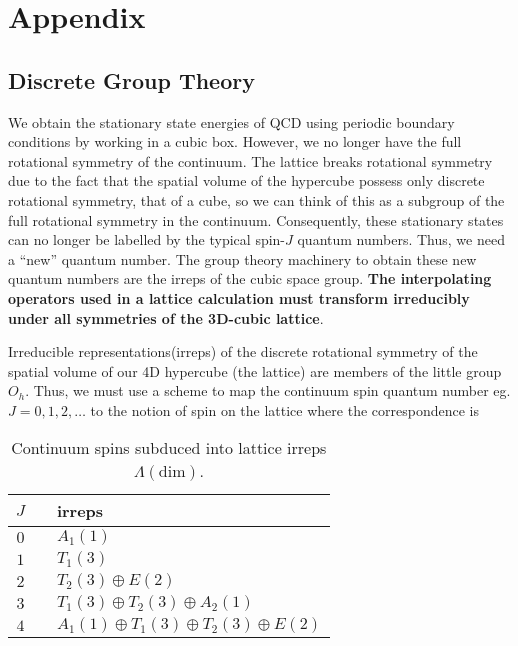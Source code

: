 \chapter{Appendix}
\label{sec:app}

\section{Discrete Group Theory}

We obtain the stationary state energies of QCD using periodic boundary conditions by working in a cubic box. However, we no longer have the full rotational symmetry of the continuum. The lattice breaks rotational symmetry due to the fact that the spatial volume of the hypercube possess only discrete rotational symmetry, that of a cube, so we can think of this as a subgroup of the full rotational symmetry in the continuum. Consequently, these stationary states can no longer be labelled by the typical spin-$J$ quantum numbers. Thus, we need a ``new'' quantum number. The group theory machinery to obtain these new quantum numbers are the irreps of the cubic space group. \textbf{The interpolating operators used in a lattice calculation must transform irreducibly under all symmetries of the 3D-cubic lattice}. 

 Irreducible representations(irreps) of the discrete rotational symmetry of the spatial volume of our 4D hypercube (the lattice) are members of the little group $O_h$. Thus, we must use a scheme to map the continuum spin quantum number eg. $J=0,1,2,\dots$ to the notion of spin on the lattice where the correspondence is \cite{Dudek_2010}
\begin{table}
    \begin{tabular}{ccl}
    $J$ & & irreps \\
    \hline
    $0$ & & $A_1(1)$ \\
    $1$ & & $T_1(3)$ \\
    $2$ & & $T_2(3) \oplus E(2)$\\
    $3$ & & $T_1(3) \oplus T_2(3) \oplus A_2(1)$\\
    $4$ & & $A_1(1) \oplus T_1(3) \oplus T_2(3) \oplus E(2)$
\end{tabular}
\caption{Continuum spins subduced into lattice irreps $\Lambda(\mathrm{dim})$.}
\label{Table:Subduce}
\end{table}
    
